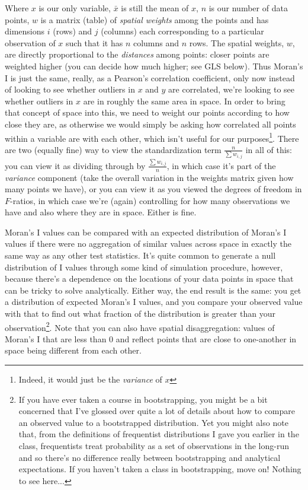 Where $x$ is our only variable, $\bar{x}$ is still the mean of $x$,
$n$ is our number of data points, $w$ is a matrix (table) of
\emph{spatial weights} among the points and has dimensions $i$ (rows)
and $j$ (columns) each corresponding to a particular observation of
$x$ such that it has $n$ columns and $n$ rows. The spatial weights,
$w$, are directly proportional to the \emph{distances} among points:
closer points are weighted higher (you can decide how much higher; see
GLS below). Thus Moran's I is just the same, really, as a Pearson's
correlation coefficient, only now instead of looking to see whether
outliers in $x$ and $y$ are correlated, we're looking to see whether
outliers in $x$ are in roughly the same area in space. In order to
bring that concept of space into this, we need to weight our points
according to how close they are, as otherwise we would simply be
asking how correlated all points within a variable are with each
other, which isn't useful for our purposes\footnote{Indeed, it would
  just be the \emph{variance} of $x$}. There are two (equally fine)
way to view the standardization term $\frac{n}{\sum w_{i,j}}$ in all
of this: you can view it as dividing through by
$\frac{\sum w_{i,j}}{n}$, in which case it's part of the
\emph{variance} component (take the overall variation in the weights
matrix given how many points we have), or you can view it as you
viewed the degrees of freedom in $F$-ratios, in which case we're
(again) controlling for how many observations we have and also where
they are in space. Either is fine.

Moran's I values can be compared with an expected distribution of
Moran's I values if there were no aggregation of similar values across
space in exactly the same way as any other test statistics. It's quite
common to generate a null distribution of I values through some kind
of simulation procedure, however, because there's a dependence on the
locations of your data points in space that can be tricky to solve
analytically. Either way, the end result is the same: you get a
distribution of expected Moran's I values, and you compare your
observed value with that to find out what fraction of the distribution
is greater than your observation\footnote{If you have ever taken a
  course in bootstrapping, you might be a bit concerned that I've
  glossed over quite a lot of details about how to compare an observed
  value to a bootstrapped distribution. Yet you might also note that,
  from the definitions of frequentist distributions I gave you earlier
  in the class, frequentists treat probability as a set of
  observations in the long-run and so there's no difference really
  between bootstrapping and analytical expectations. If you haven't
  taken a class in bootstrapping, move on! Nothing to see
  here...}. Note that you can also have spatial disaggregation: values
of Moran's I that are less than $0$ and reflect points that are close
to one-another in space being different from each other.

